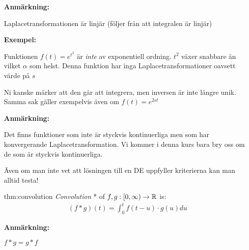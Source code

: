 \par\bigskip
\noindent\textbf{Anmärkning:}\par
\noindent Laplacetransformationen är linjär (följer från att integralen är linjär)
\par\bigskip
\noindent\textbf{Exempel:}\par
\noindent Funktionen $f(t) = e^{t^2}$ är \textit{inte} av exponentiell ordning. $t^2$ växer snabbare än vilket $\alpha$ som helst. Denna funktion har inga Laplacetransformationer oavsett värde på $s$
\par\bigskip
\noindent Ni kanske märker att den går att integrera, men inversen är inte längre unik. Samma sak gäller exempelvis även om $f(t) = e^{2st}$ 
\par\bigskip
\noindent\textbf{Anmärkning:}\par
\noindent Det finns funktioner som inte är styckvis kontinuerliga men som har konvergerande Laplacetransformation. Vi kommer i denna kurs bara bry oss om de som är styckvis kontinuerliga.
\par\bigskip
\noindent Även om man inte vet att lösningen till en DE uppfyller kriterierna kan man alltid testa! 
\par\bigskip
\begin{theo}[Convolution]{thm:convolution}
  \textit{Convolution} * of $f,g:[0,\infty)\to\mathbb{R}$ is:
  \begin{equation*}
    \begin{gathered}
      (f*g)(t) = \int_{0}^{t}f(t-u)\cdot g(u)du
    \end{gathered}
  \end{equation*}
\end{theo}
\par\bigskip
\noindent\textbf{Anmärkning:}\par
\noindent $f*g = g*f$
\newpage
